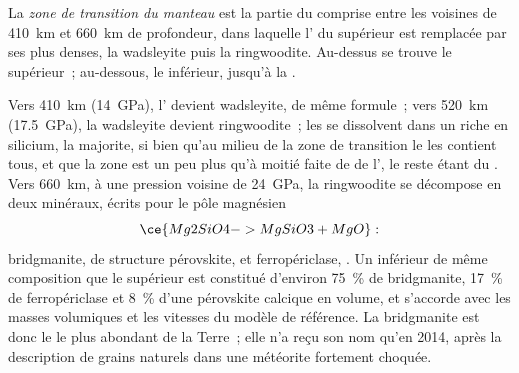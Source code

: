 \begin{definition}\label{def:b1:layered-earth:transition-zone}
La \emph{zone de transition du manteau} est la partie
du  comprise entre les  voisines de \qty{410}{km} et
\qty{660}{km} de profondeur, dans laquelle l' du  supérieur est
remplacée par ses  plus denses, la wadsleyite puis la ringwoodite.
Au-dessus se trouve le  supérieur~; au-dessous, le  inférieur,
jusqu'à la .
\end{definition}

Vers \qty{410}{km} (\qty{14}{GPa}), l'  devient
wadsleyite, de même formule~; vers \qty{520}{km} (\qty{17.5}{GPa}), la wadsleyite
devient ringwoodite~; les  se dissolvent dans un  riche en silicium,
la majorite, si bien qu'au milieu de la zone de transition le  les contient
tous, et que la zone est un peu plus qu'à moitié faite de  de l',
le reste étant du . Vers \qty{660}{km}, à une pression voisine de
\qty{24}{GPa}, la ringwoodite se décompose en
deux minéraux, écrits pour le pôle magnésien
\[
  \ce{Mg2SiO4 -> MgSiO3 + MgO}:
\]
bridgmanite,  de structure pérovskite, et ferropériclase,
. Un  inférieur de même composition que le  supérieur
est constitué d'environ \qty{75}{\percent} de bridgmanite, \qty{17}{\percent} de
ferropériclase et \qty{8}{\percent} d'une pérovskite calcique en volume, et
s'accorde avec les masses volumiques et les vitesses du modèle de référence. La
bridgmanite est donc le  le plus abondant de la Terre~; elle n'a reçu son
nom qu'en 2014, après la description de grains naturels dans une météorite
fortement choquée.

